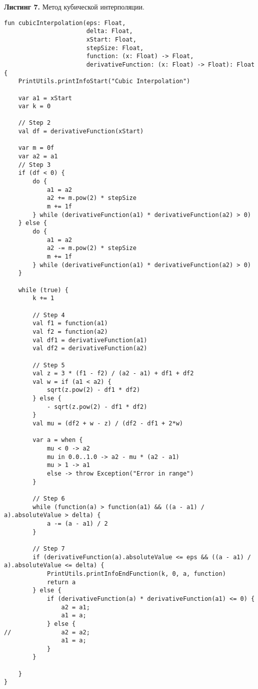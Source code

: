 \documentclass[a4paper, 12pt]{article}   	%
\begin{document}
    \textbf{Листинг 7.} Метод кубической интерполяции.
    \begin{verbatim}
fun cubicInterpolation(eps: Float,
                       delta: Float,
                       xStart: Float,
                       stepSize: Float,
                       function: (x: Float) -> Float,
                       derivativeFunction: (x: Float) -> Float): Float {
    PrintUtils.printInfoStart("Cubic Interpolation")

    var a1 = xStart
    var k = 0

    // Step 2
    val df = derivativeFunction(xStart)

    var m = 0f
    var a2 = a1
    // Step 3
    if (df < 0) {
        do {
            a1 = a2
            a2 += m.pow(2) * stepSize
            m += 1f
        } while (derivativeFunction(a1) * derivativeFunction(a2) > 0)
    } else {
        do {
            a1 = a2
            a2 -= m.pow(2) * stepSize
            m += 1f
        } while (derivativeFunction(a1) * derivativeFunction(a2) > 0)
    }

    while (true) {
        k += 1

        // Step 4
        val f1 = function(a1)
        val f2 = function(a2)
        val df1 = derivativeFunction(a1)
        val df2 = derivativeFunction(a2)

        // Step 5
        val z = 3 * (f1 - f2) / (a2 - a1) + df1 + df2
        val w = if (a1 < a2) {
            sqrt(z.pow(2) - df1 * df2)
        } else {
            - sqrt(z.pow(2) - df1 * df2)
        }
        val mu = (df2 + w - z) / (df2 - df1 + 2*w)

        var a = when {
            mu < 0 -> a2
            mu in 0.0..1.0 -> a2 - mu * (a2 - a1)
            mu > 1 -> a1
            else -> throw Exception("Error in range")
        }

        // Step 6
        while (function(a) > function(a1) && ((a - a1) / a).absoluteValue > delta) {
            a -= (a - a1) / 2
        }

        // Step 7
        if (derivativeFunction(a).absoluteValue <= eps && ((a - a1) / a).absoluteValue <= delta) {
            PrintUtils.printInfoEndFunction(k, 0, a, function)
            return a
        } else {
            if (derivativeFunction(a) * derivativeFunction(a1) <= 0) {
                a2 = a1;
                a1 = a;
            } else {
//              a2 = a2;
                a1 = a;
            }
        }

    }
}
    \end{verbatim}
    
\end{document}
